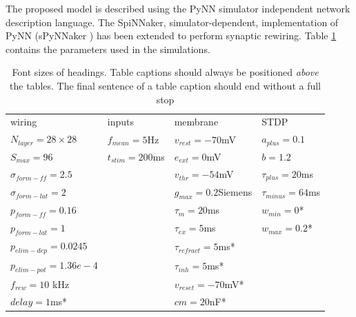 \documentclass[letterpaper, 10 pt, conference]{ieeeconf}  %
\begin{document}
The proposed model is described using the PyNN \cite{davison2009pynn} simulator independent network description language. The SpiNNaker, simulator-dependent, implementation of PyNN (sPyNNaker \cite{rhodes2018spynnaker}) has been extended to perform synaptic rewiring. Table \ref{tab:sim_params} contains the parameters used in the simulations.

\setlength{\tabcolsep}{4pt}
\begin{table}
\begin{center}
\caption{Font sizes of headings. Table captions should always be
positioned {\it above} the tables. The final sentence of a table
caption should end without a full stop}
\label{tab:sim_params}
\begin{tabular}{llll}
\hline\noalign{\smallskip}
    wiring & inputs & membrane & STDP \\
\noalign{\smallskip}
\hline
\noalign{\smallskip}
    $N_{layer}=28\times28$ 	& $f_{mean}=5$Hz 	& $v_{rest} = -70$mV 	& $a_{plus} = 0.1$ \\
    $S_{max}=96 $ 			& $t_{stim}=200$ms 	& $e_{ext} = 0$mV  		& $b = 1.2$	   \\
    $\sigma_{form-ff}=2.5$		& ~ 				& $v_{thr} = -54$mV 		& $\tau_{plus} = 20$ms \\
    $\sigma_{form-lat}=2$ 		& ~ 				& $g_{max} = 0.2$Siemens& $\tau_{minus} = 64$ms \\
    $p_{form-ff}=0.16$ 		& ~  				 & $\tau_{m}=20$ms  		& $w_{min} = 0$*   \\
    $p_{form-lat}=1$ 			& ~  				& $\tau_{ex}=5$ms 		& $w_{max} = 0.2$*\\
    $p_{elim-dep}=0.0245$		& ~  				& $\tau_{refract}=5$ms* & ~  \\
    $p_{elim-pot}=1.36 e -4$ 	& ~  				& $\tau_{inh}=5$ms* 	& ~ \\
    $f_{rew}=10$ kHz			& ~  				& $v_{reset} = -70$mV* 	& ~ \\
    $delay = 1$ms*			& ~  				& $cm = 20$nF*			& ~  \\
\hline
\end{tabular}
\end{center}
\end{table}
\setlength{\tabcolsep}{1.4pt}
\end{document}
